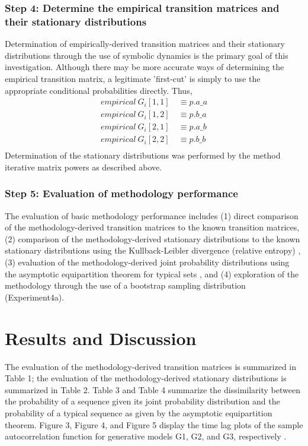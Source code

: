 \documentclass[letter,11pt]{article}
\begin{document}
\subsubsection{Step 4: Determine the empirical transition matrices and their stationary distributions}
Determination of empirically-derived transition matrices and their stationary distributions through the use of symbolic dynamics is the primary goal of this investigation. Although there may be more accurate ways of determining the empirical transition matrix, a legitimate 'first-cut' is simply to use the appropriate conditional probabilities directly. Thus, 
\begin{align*}
 empirical \ G_{i}[1,1] \ &\equiv p.a\_a \\
 empirical \ G_{i}[1,2] \ &\equiv p.b\_a\\
 empirical \ G_{i}[2,1] \ &\equiv p.a\_b\\
 empirical \ G_{i}[2,2] \ &\equiv p.b\_b\\
 \end{align*}
Determination of the stationary distributions was performed by the method iterative matrix powers as described above.   
\subsubsection{Step 5: Evaluation of methodology performance}
The evaluation of basic methodology performance includes (1) direct comparison of the methodology-derived transition matrices to the known transition matrices, (2) comparison of the methodology-derived stationary distributions to the known stationary distributions using the Kullback-Leibler divergence (relative entropy) \cite{mackay_information_2003}, (3) evaluation of the methodology-derived joint probability distributions using the asymptotic equipartition theorem for typical sets \cite{cover_elements_2006}, and (4) exploration of the methodology through the use of a bootstrap sampling distribution (Experiment4a)\cite{lunneborg_data_2000}.

\section{Results and Discussion}
The evaluation of the methodology-derived transition matrices is summarized in Table 1; the evaluation of the methodology-derived stationary distributions is summarized in Table 2. Table 3 and Table 4 summarize the dissimilarity between the probability of a sequence given its joint probability distribution and the probability of a typical sequence as given by the asymptotic equipartition theorem. Figure 3, Figure 4, and Figure 5 display the time lag plots of the sample autocorrelation function for generative models G1, G2, and G3, respectively \cite{shumway_time_2011}.
\end{document}
